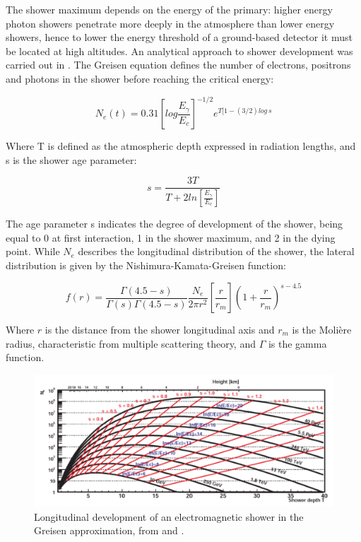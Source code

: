 \documentclass[main.tex]{subfiles}
\begin{document}
The shower maximum depends on the energy of the primary: higher energy photon showers penetrate more deeply in the atmosphere than lower energy showers, hence to lower the energy threshold of a ground-based detector it must be located at high altitudes.
An analytical approach to shower development was carried out in \cite{RossiGreisenCR}. The Greisen equation defines the number of electrons, positrons and photons in the shower before reaching the critical energy:

\begin{equation}
  N_{e}(t) = 0.31 \left[log \frac{E_{\gamma}}{E_{c}}\right]^{-1/2} e^{T[1-(3/2)log\,s}
\end{equation}

Where T is defined as the atmospheric depth expressed in radiation lengths, and s is the shower age parameter:

\begin{equation}
  s = \frac{3T}{T+2ln \left[\frac{E_{\gamma}}{E_c}\right]}
\end{equation}

The age parameter s indicates the degree of development of the shower, being equal to 0  at first interaction, 1 in the shower maximum, and 2 in the dying point.
While $N_{e}$ describes the longitudinal distribution of the shower, the lateral distribution is given by the Nishimura-Kamata-Greisen function:

\begin{equation}
  f(r) = \frac{\Gamma(4.5-s)}{\Gamma(s)\Gamma(4.5-s)} \frac{N_e}{2\pi r^2}\left[\frac{r}{r_m} \right] \left( 1+\frac{r}{r_m} \right)^{s-4.5}
\end{equation}

Where $r$ is the distance from the shower longitudinal axis and $r_{m}$ is the Molière radius, characteristic from multiple scattering theory,  and $\Gamma$ is the gamma function.

\begin{figure}[h]
  \centering
  \includegraphics[width=1\textwidth]{Pictures/showerdevelop.pdf}
  \caption{Longitudinal development of an electromagnetic shower in the Greisen approximation, from \cite{IOyaThesis} and \cite{TarekThesis}.}
  \label{fig:showeredel}
\end{figure}
\end{document}
